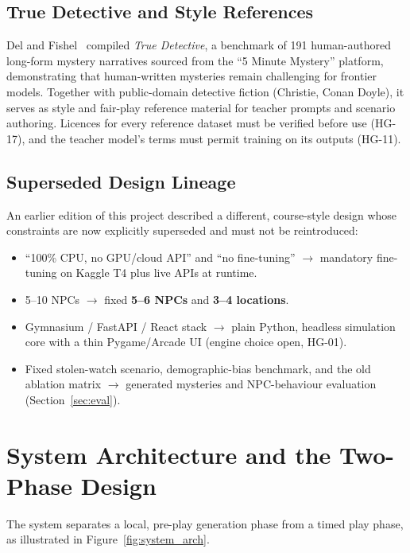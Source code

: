 \documentclass[11pt,a4paper]{article}
\begin{document}
\subsection{True Detective and Style References}
Del and Fishel~\cite{del2023true} compiled \emph{True Detective}, a benchmark of 191 human-authored long-form mystery narratives sourced from the ``5 Minute Mystery'' platform, demonstrating that human-written mysteries remain challenging for frontier models. Together with public-domain detective fiction (Christie, Conan Doyle), it serves as style and fair-play reference material for teacher prompts and scenario authoring. Licences for every reference dataset must be verified before use (HG-17), and the teacher model's terms must permit training on its outputs (HG-11).

\subsection{Superseded Design Lineage}
An earlier edition of this project described a different, course-style design whose constraints are now explicitly superseded and must not be reintroduced:
\begin{itemize}
    \item ``100\% CPU, no GPU/cloud API'' and ``no fine-tuning'' $\rightarrow$ mandatory fine-tuning on Kaggle T4 plus live APIs at runtime.
    \item 5--10 NPCs $\rightarrow$ fixed \textbf{5--6 NPCs} and \textbf{3--4 locations}.
    \item Gymnasium / FastAPI / React stack $\rightarrow$ plain Python, headless simulation core with a thin Pygame/Arcade UI (engine choice open, HG-01).
    \item Fixed stolen-watch scenario, demographic-bias benchmark, and the old ablation matrix $\rightarrow$ generated mysteries and NPC-behaviour evaluation (Section~\ref{sec:eval}).
\end{itemize}

\section{System Architecture and the Two-Phase Design}

The system separates a local, pre-play generation phase from a timed play phase, as illustrated in Figure~\ref{fig:system_arch}.
\end{document}

